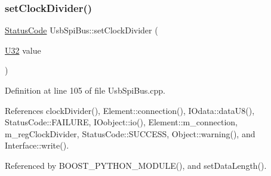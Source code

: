 \subsubsection{\texorpdfstring{set\+Clock\+Divider()}{setClockDivider()}}
{\footnotesize\ttfamily \hyperlink{classStatusCode}{Status\+Code} Usb\+Spi\+Bus\+::set\+Clock\+Divider (\begin{DoxyParamCaption}\item[{\hyperlink{classUsbSpiBus_a9b24e28662a35ca57f5ed32c41c5f3ff}{U32}}]{value }\end{DoxyParamCaption})}



Definition at line 105 of file Usb\+Spi\+Bus.\+cpp.



References clock\+Divider(), Element\+::connection(), I\+Odata\+::data\+U8(), Status\+Code\+::\+F\+A\+I\+L\+U\+RE, I\+Oobject\+::io(), Element\+::m\+\_\+connection, m\+\_\+reg\+Clock\+Divider, Status\+Code\+::\+S\+U\+C\+C\+E\+SS, Object\+::warning(), and Interface\+::write().



Referenced by B\+O\+O\+S\+T\+\_\+\+P\+Y\+T\+H\+O\+N\+\_\+\+M\+O\+D\+U\+L\+E(), and set\+Data\+Length().


